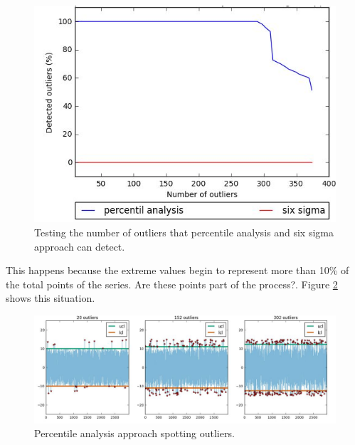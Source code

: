   
\begin{figure}[h!]
  \vspace{0.5em} %
  \includegraphics[scale=0.5]{Figures/test2.jpg}
  \caption{Testing the number of outliers that percentile analysis and six sigma approach can detect.}  
  \label{fig:test2}
\end{figure}

This happens because the extreme values begin to represent more than 10\% of the total points of the series. Are these points part of the process?. Figure \ref{fig:test3} shows this situation. 

\begin{figure}[h!]
  \vspace{0.5em} %
  \includegraphics[scale=0.5]{Figures/test3.jpg}
  \caption{Percentile analysis approach spotting outliers.}  
  \label{fig:test3}
\end{figure}

